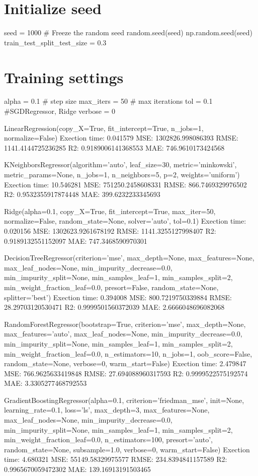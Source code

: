 \documentclass[11pt]{article}
\begin{document}
    \section{Initialize seed}\label{initialize-seed}

seed = 1000 \# Freeze the random seed random.seed(seed)
np.random.seed(seed) train\_test\_split\_test\_size = 0.3

\section{Training settings}\label{training-settings}

alpha = 0.1 \# step size max\_iters = 50 \# max iterations tol = 0.1
\#SGDRegressor, Ridge verbose = 0

LinearRegression(copy\_X=True, fit\_intercept=True, n\_jobs=1,
normalize=False) Exection time: 0.041579 MSE: 1302826.998086393 RMSE:
1141.4144725236285 R2: 0.9189006141368553 MAE: 746.9610173424568

KNeighborsRegressor(algorithm='auto', leaf\_size=30, metric='minkowski',
metric\_params=None, n\_jobs=1, n\_neighbors=5, p=2, weights='uniform')
Exection time: 10.546281 MSE: 751250.2458608331 RMSE: 866.7469329976502
R2: 0.9532355917874448 MAE: 399.6232233345693

Ridge(alpha=0.1, copy\_X=True, fit\_intercept=True, max\_iter=50,
normalize=False, random\_state=None, solver='auto', tol=0.1) Exection
time: 0.020156 MSE: 1302623.9261678192 RMSE: 1141.3255127998407 R2:
0.9189132551152097 MAE: 747.3468590970301

DecisionTreeRegressor(criterion='mse', max\_depth=None,
max\_features=None, max\_leaf\_nodes=None, min\_impurity\_decrease=0.0,
min\_impurity\_split=None, min\_samples\_leaf=1, min\_samples\_split=2,
min\_weight\_fraction\_leaf=0.0, presort=False, random\_state=None,
splitter='best') Exection time: 0.394008 MSE: 800.7219750339884 RMSE:
28.29703120530471 R2: 0.9999501560372039 MAE: 2.6666048696082068

RandomForestRegressor(bootstrap=True, criterion='mse', max\_depth=None,
max\_features='auto', max\_leaf\_nodes=None,
min\_impurity\_decrease=0.0, min\_impurity\_split=None,
min\_samples\_leaf=1, min\_samples\_split=2,
min\_weight\_fraction\_leaf=0.0, n\_estimators=10, n\_jobs=1,
oob\_score=False, random\_state=None, verbose=0, warm\_start=False)
Exection time: 2.479847 MSE: 766.9625633419848 RMSE: 27.694088960317593
R2: 0.9999522575192574 MAE: 3.3305277468792553

GradientBoostingRegressor(alpha=0.1, criterion='friedman\_mse',
init=None, learning\_rate=0.1, loss='ls', max\_depth=3,
max\_features=None, max\_leaf\_nodes=None, min\_impurity\_decrease=0.0,
min\_impurity\_split=None, min\_samples\_leaf=1, min\_samples\_split=2,
min\_weight\_fraction\_leaf=0.0, n\_estimators=100, presort='auto',
random\_state=None, subsample=1.0, verbose=0, warm\_start=False)
Exection time: 4.680321 MSE: 55149.58329975577 RMSE: 234.8394841157589
R2: 0.9965670059472302 MAE: 139.16913191503465
\end{document}
